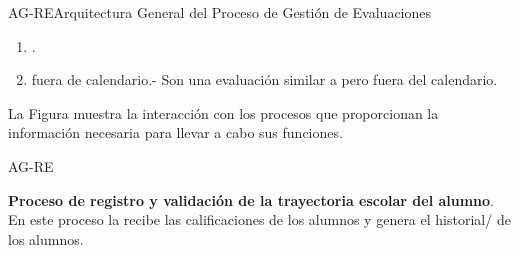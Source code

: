 \begin{Arquitectura}{AG-RE}{Arquitectura General del Proceso de Gestión de Evaluaciones}
{\begin{enumerate}
\begin{enumerate}
				\item Servicio social.- Es una actividad formativa y de servicio, que afirma y amplía la información académica del estudiante y además permite fomentar en él una conciencia de solidaridad con la sociedad, siendo una actividad de carácter temporal y obligatorio que institucionalmente ejecutan y prestan los estudiantes en beneficio de la sociedad. 
			\end{enumerate}
			\item {}.
			\item {} fuera de calendario.- Son una evaluación similar a  pero fuera del calendario.
		\end{enumerate}
		
		

		\noindent La Figura  muestra la interacción con los procesos que proporcionan la información necesaria para llevar a cabo sus funciones.

		
	}{AG-RE}

\end{Arquitectura}


\begin{ADescripcion}
	
	\item \textbf{Proceso de registro y validación de la trayectoria escolar del alumno}. En este proceso la  recibe las calificaciones de los alumnos y genera el historial/ de los alumnos.
	
\end{ADescripcion}


